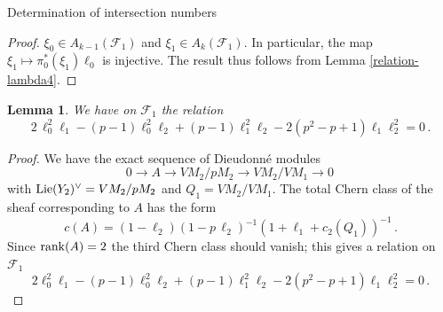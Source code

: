 \documentclass[11pt]{amsart}
\numberwithin{equation}{section}
\newtheorem{lemma}[theorem]{Lemma}
\theoremstyle{definition}
\theoremstyle{remark}
\begin{document}
\begin{section}{Determination of intersection numbers}
\begin{proof}
$\xi_0\in A_{k-1}(\mathcal{F}_1)$ and $\xi_1 \in A_k(\mathcal{F}_1)$.
In particular, the map $\xi_1 \mapsto \pi_{0}^*(\xi_1)\ell_0$ is injective. The result thus follows 
from Lemma \ref{relation-lambda4}.
\end{proof}
\begin{lemma}\label{second-relation}
We have on $\mathcal{F}_1$ the relation
$$
2\, \ell_0^2\ell_1-(p-1) \ell_0^2\ell_2 +(p-1)\ell_1^2\ell_2 -2(p^2-p+1) \ell_1\ell_2^2 =0\, .
$$
\end{lemma}
\begin{proof}
We have the exact sequence of Dieudonn\'e modules
$$
0 \to A \to VM_2/pM_2 \to VM_2/VM_1 \to 0\, 
$$
with ${\rm Lie}(Y_2)^\vee = VM_2/pM_2$ and $Q_1 = VM_2/VM_1$.
The total Chern class of the sheaf corresponding to $A$ has the form
$$
c(A)=(1-\ell_2)(1-p\, \ell_2)^{-1}(1+\ell_1+c_2(Q_1))^{-1}\, .
$$
Since ${\rm rank}(A)=2$ the third Chern class should vanish; this gives
a relation on $\mathcal{F}_1$
$$
2\ell_0^2\ell_1-(p-1) \ell_0^2\ell_2 +(p-1)\ell_1^2\ell_2 -2(p^2-p+1) \ell_1\ell_2^2 =0\, .
$$
\end{proof}


\end{section}
\end{document}
